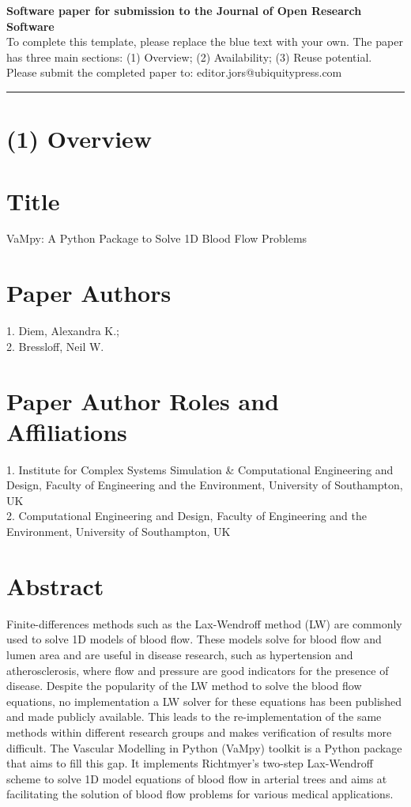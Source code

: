 \documentclass{jors}
\begin{document}
{\bf Software paper for submission to the Journal of Open Research Software} \\

To complete this template, please replace the blue text with your own. The paper has three main sections: (1) Overview; (2) Availability; (3) Reuse potential. \\

Please submit the completed paper to: editor.jors@ubiquitypress.com

\rule{\textwidth}{1pt}

\section*{(1) Overview}

\vspace{0.5cm}

\section*{Title}

VaMpy: A Python Package to Solve 1D Blood Flow Problems

\section*{Paper Authors}

1. Diem, Alexandra K.; \\
2. Bressloff, Neil W.

\section*{Paper Author Roles and Affiliations}
1. Institute for Complex Systems Simulation \& Computational Engineering and Design, Faculty of Engineering and the Environment, University of Southampton, UK \\
2. Computational Engineering and Design, Faculty of Engineering and the Environment, University of Southampton, UK

\section*{Abstract}
Finite-differences methods such as the Lax-Wendroff method (LW) are commonly used to solve 1D models of blood flow. These models solve for blood flow and lumen area and are useful in disease research, such as hypertension and atherosclerosis, where flow and pressure are good indicators for the presence of disease. Despite the popularity of the LW method to solve the blood flow equations, no implementation a LW solver for these equations has been published and made publicly available. This leads to the re-implementation of the same methods within different research groups and makes verification of results more difficult. The Vascular Modelling in Python (VaMpy) toolkit is a Python package that aims to fill this gap. It implements Richtmyer's two-step Lax-Wendroff scheme to solve 1D model equations of blood flow in arterial trees and aims at facilitating the solution of blood flow problems for various medical applications.
\end{document}
